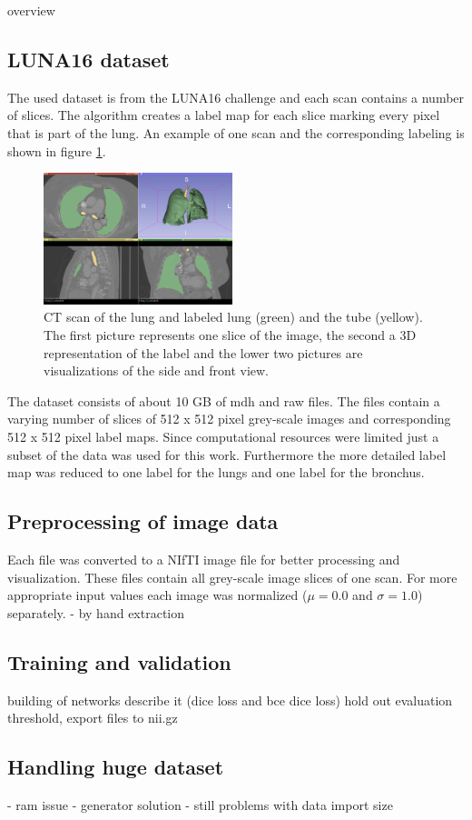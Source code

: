 
overview

\subsection{LUNA16 dataset}

The used dataset is from the LUNA16 challenge and each scan contains a number of slices. The algorithm creates a label map for each slice marking every pixel that is part of the lung. An example of one scan and the corresponding labeling is shown in figure \ref{scan_picture}.

\begin{figure}[h!]
	\includegraphics[width=0.49\textwidth, angle=0]{files/Fulllayoutprediction.png}
	\caption{CT scan of the lung and labeled lung (green) and the tube (yellow). The first picture represents one slice of the image, the second a 3D representation of the label and the lower two pictures are visualizations of the side and front view.}
	\label{scan_picture}
\end{figure}

The dataset consists of about 10 GB of mdh and raw files. The files contain a varying number of slices of 512 x 512 pixel grey-scale images and corresponding 512 x 512 pixel label maps. Since computational resources were limited just a subset of the data was used for this work. Furthermore the more detailed label map was reduced to one label for the lungs and one label for the bronchus.

\subsection{Preprocessing of image data}
Each file was converted to a NIfTI image file for better processing and visualization. These files contain all grey-scale image slices of one scan. For more appropriate input values each image was normalized ($\mu = 0.0$ and $\sigma = 1.0$) separately.
- by hand extraction

\subsection{Training and validation}

building of networks
describe it (dice loss and bce dice loss)
hold out evaluation
threshold, export files to nii.gz

\subsection{Handling huge dataset}
- ram issue
- generator solution
- still problems with data import size
